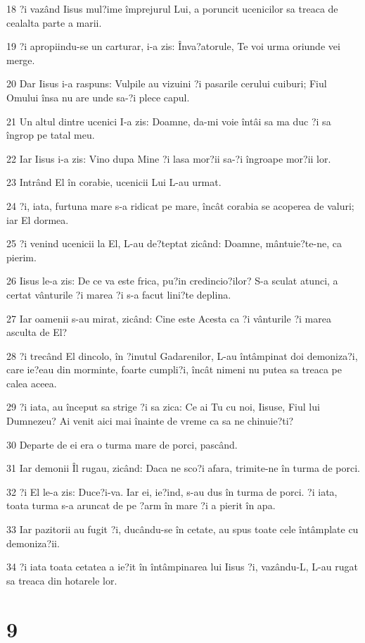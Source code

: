 \par 18 ?i vazând Iisus mul?ime împrejurul Lui, a poruncit ucenicilor sa treaca de cealalta parte a marii.
\par 19 ?i apropiindu-se un carturar, i-a zis: Înva?atorule, Te voi urma oriunde vei merge.
\par 20 Dar Iisus i-a raspuns: Vulpile au vizuini ?i pasarile cerului cuiburi; Fiul Omului însa nu are unde sa-?i plece capul.
\par 21 Un altul dintre ucenici I-a zis: Doamne, da-mi voie întâi sa ma duc ?i sa îngrop pe tatal meu.
\par 22 Iar Iisus i-a zis: Vino dupa Mine ?i lasa mor?ii sa-?i îngroape mor?ii lor.
\par 23 Intrând El în corabie, ucenicii Lui L-au urmat.
\par 24 ?i, iata, furtuna mare s-a ridicat pe mare, încât corabia se acoperea de valuri; iar El dormea.
\par 25 ?i venind ucenicii la El, L-au de?teptat zicând: Doamne, mântuie?te-ne, ca pierim.
\par 26 Iisus le-a zis: De ce va este frica, pu?in credincio?ilor? S-a sculat atunci, a certat vânturile ?i marea ?i s-a facut lini?te deplina.
\par 27 Iar oamenii s-au mirat, zicând: Cine este Acesta ca ?i vânturile ?i marea asculta de El?
\par 28 ?i trecând El dincolo, în ?inutul Gadarenilor, L-au întâmpinat doi demoniza?i, care ie?eau din morminte, foarte cumpli?i, încât nimeni nu putea sa treaca pe calea aceea.
\par 29 ?i iata, au început sa strige ?i sa zica: Ce ai Tu cu noi, Iisuse, Fiul lui Dumnezeu? Ai venit aici mai înainte de vreme ca sa ne chinuie?ti?
\par 30 Departe de ei era o turma mare de porci, pascând.
\par 31 Iar demonii Îl rugau, zicând: Daca ne sco?i afara, trimite-ne în turma de porci.
\par 32 ?i El le-a zis: Duce?i-va. Iar ei, ie?ind, s-au dus în turma de porci. ?i iata, toata turma s-a aruncat de pe ?arm în mare ?i a pierit în apa.
\par 33 Iar pazitorii au fugit ?i, ducându-se în cetate, au spus toate cele întâmplate cu demoniza?ii.
\par 34 ?i iata toata cetatea a ie?it în întâmpinarea lui Iisus ?i, vazându-L, L-au rugat sa treaca din hotarele lor.

\chapter{9}

